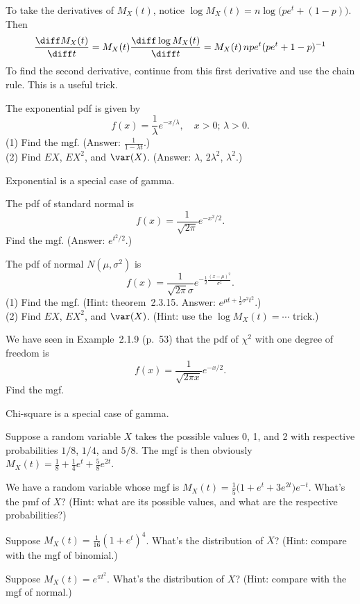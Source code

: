 \documentclass[12pt]{article}
\begin{document}
To take the derivatives of $M_X(t)$, notice
$\log M_X(t) = n\log\bigl(pe^t + (1-p)\bigr)$.
Then
\[
\frac{\diff M_X(t)}{\diff t}
= M_X(t) \frac{\diff \log M_X(t)}{\diff t}
= M_X(t) \, npe^t(pe^t + 1 - p)^{-1}
\]
To find the second derivative,
continue from this first derivative and use the chain rule.
This is a useful trick.

\example
The exponential pdf is given by
\[
f(x) = \frac{1}{\lambda} e^{-x/\lambda},
\quad
x > 0;\,
\lambda > 0
.
\]
(1) Find the mgf. (Answer: $\frac{1}{1-\lambda t}$.)
\\
(2) Find $E X$, $E X^2$, and $\var(X)$.
(Answer: $\lambda$, $2\lambda^2$, $\lambda^2$.)

\alert[Comment]%
Exponential is a special case of gamma.

\example
The pdf of standard normal is
\[
f(x) = \frac{1}{\sqrt{2\pi}} e^{-x^2/2}
.
\]
Find the mgf.
(Answer: $e^{t^2/2}$.)

\example
The pdf of normal $N(\mu, \sigma^2)$ is
\[
f(x) = \frac{1}{\sqrt{2\pi} \sigma} e^{-\frac{1}{2}\frac{(x - \mu)^2}{\sigma^2}}
.
\]
(1) Find the mgf.
(Hint: theorem~2.3.15. Answer: $e^{\mu t + \frac{1}{2}\sigma^2t^2}$.)
\\
(2) Find $E X$, $E X^2$, and $\var(X)$.
(Hint: use the $\log M_X(t) = \dotsb$ trick.)

\example
We have seen in Example~2.1.9 (p.~53) that the pdf of $\chi^2$ with one
degree of freedom is
\[
f(x) = \frac{1}{\sqrt{2\pi x}} e^{-x/2}
.
\]
Find the mgf.

\alert[Comment]%
Chi-square is a special case of gamma.

\example
Suppose a random variable $X$ takes the possible values
0, 1, and 2 with respective probabilities
$1/8$, $1/4$, and $5/8$.
The mgf is then obviously
$M_X(t) = \frac{1}{8} + \frac{1}{4}e^t + \frac{5}{8}e^{2t}$.

\example
We have a random variable whose mgf is
$M_X(t) = \frac{1}{5}\bigl(1 + e^t + 3e^{2t}\bigr)e^{-t}$.
What's the pmf of $X$?
(Hint: what are its possible values, and what are the respective
probabilities?)

\example
Suppose
$M_X(t) = \frac{1}{16}(1 + e^t)^4$.
What's the distribution of $X$?
(Hint: compare with the mgf of binomial.)


\example
Suppose
$M_X(t) = e^{\pi t^2}$.
What's the distribution of $X$?
(Hint: compare with the mgf of normal.)
\end{document}
